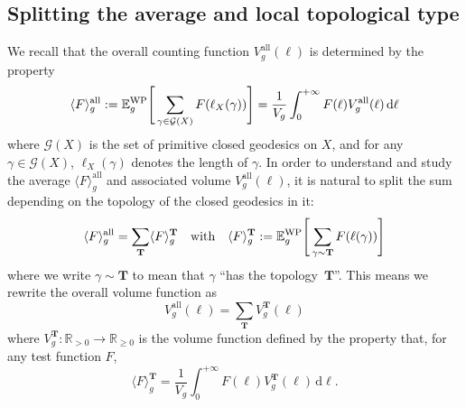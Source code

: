 \documentclass[12pt,twoside]{article}
\theoremstyle{theorem}
\theoremstyle{remark}
\theoremstyle{definition}
\theoremstyle{example}
\newcommand{\R}{\mathbb{R}}
\renewcommand{\d}{\, \mathrm{d}}
\newcommand{\1}[1]{\mathds{1}_{#1}}
\newcommand{\cM}{\mathcal{M}}
\newcommand{\cG}{\mathcal{G}}
\newcommand{\Ewp}[2][g]{\mathbb{E}_{#1}^{\mathrm{\scriptsize{WP}}} \Bigg[ #2 \Bigg]}
\newcommand{\type}{\mathbf{T}}
\newcommand{\av}[2][\mathrm{all}]{\langle #2 \rangle_g^{{#1}}}
\begin{document}

\subsection{Splitting the average and local topological type}
\label{sec:defin-volume-funct}





We recall that the overall counting function $V_g^{\mathrm{all}}(\ell)$ is determined by the
property
\begin{equation}
  \label{e:def_av_all}
  \av{F} := \Ewp{\sum_{\gamma \in \cG(X)} F(\ell_X(\gamma))}
  = \frac{1}{V_g} \int_0^{+ \infty} F(\ell) V_g^{\mathrm{all}}(\ell) \d \ell
\end{equation}
where $\cG(X)$ is the set of primitive closed geodesics on $X$, and for any $\gamma \in \cG(X)$,
$\ell_X(\gamma)$ denotes the length of $\gamma$.  In order to understand and study the average
$\av{F}$ and associated volume $V_g^{\mathrm{all}}(\ell)$, it is natural to split the sum depending
on the topology of the closed geodesics in it:
\begin{equation}
  \label{eq:def_av_T}
  \av[\mathrm{all}]{F} = \sum_{\type} \av[\type]{F}
  \quad \text{with} \quad
  \av[\type]{F}
  := \Ewp{\sum_{\gamma \sim \type}F(\ell(\gamma))}
\end{equation}
where we write $\gamma \sim \type$ to mean that $\gamma$ ``has the topology~$\type$''.  This
means we rewrite the overall volume function as
\begin{equation}
  \label{eq:vol_T}
  V_g^{\mathrm{all}}(\ell) = \sum_{\type}  V_g^{\type}(\ell)
\end{equation}
where $V_g^{\type} : \R_{>0} \rightarrow \R_{\geq 0}$ is the volume function defined by the property
that, for any test function $F$,
\begin{equation}
  \label{eq:av_T}
  \av[\type]{F}
    = \frac{1}{V_g} \int_0^{+ \infty} F(\ell) V_g^{\type}(\ell) \d \ell.
\end{equation}
\end{document}
